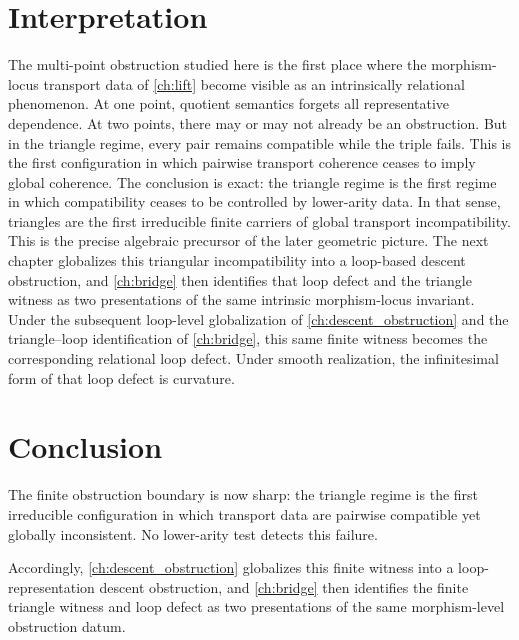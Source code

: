 \section{Interpretation}
The multi-point obstruction studied here is the first place where the
morphism-locus transport data of \cref{ch:lift} become visible as
an intrinsically relational phenomenon.
At one point, quotient semantics forgets all representative dependence.
At two points, there may or may not already be an obstruction. But in
the triangle regime, every pair remains compatible while the triple
fails. This is the first configuration in which pairwise transport
coherence ceases to imply global coherence.
The conclusion is exact: the triangle regime is the first regime in
which compatibility ceases to be controlled by lower-arity data. In that
sense, triangles are the first irreducible finite carriers of global
transport incompatibility.
This is the precise algebraic precursor of the later geometric picture.
The next chapter globalizes this triangular incompatibility into a
loop-based descent obstruction, and \cref{ch:bridge} then identifies
that loop defect and the triangle witness as two presentations of the
same intrinsic morphism-locus invariant. Under the subsequent
loop-level globalization of \cref{ch:descent_obstruction} and the
triangle--loop identification of \cref{ch:bridge}, this same finite
witness becomes the corresponding relational loop defect. Under smooth
realization, the infinitesimal form of that loop defect is curvature.

\section{Conclusion}
\label{sec:triangles-conclusion}
The finite obstruction boundary is now sharp: the triangle regime is the
first irreducible configuration in which transport data are pairwise
compatible yet globally inconsistent. No lower-arity test detects this
failure.

Accordingly, \cref{ch:descent_obstruction} globalizes this finite
witness into a loop-representation descent obstruction, and
\cref{ch:bridge} then identifies the finite triangle witness and loop
defect as two presentations of the same morphism-level obstruction
datum.

\begin{chapterclosing}
\end{chapterclosing}
